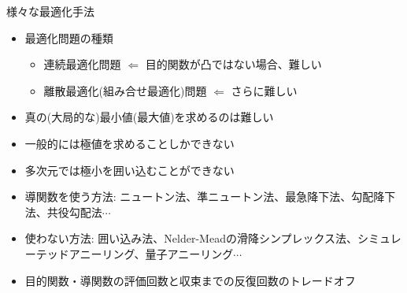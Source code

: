 \begin{frame}[t,fragile]{様々な最適化手法}
  \begin{itemize}
  \item 最適化問題の種類
    \begin{itemize}
    \item 連続最適化問題 $\Leftarrow$ 目的関数が凸ではない場合、難しい
    \item 離散最適化(組み合せ最適化)問題 $\Leftarrow$ さらに難しい
    \end{itemize}
  \item 真の(大局的な)最小値(最大値)を求めるのは難しい
  \item 一般的には極値を求めることしかできない
  \item 多次元では極小を囲い込むことができない
  \item 導関数を使う方法: ニュートン法、準ニュートン法、最急降下法、勾配降下法、共役勾配法$\cdots$
  \item 使わない方法: 囲い込み法、Nelder-Meadの滑降シンプレックス法、シミュレーテッドアニーリング、量子アニーリング$\cdots$
  \item 目的関数・導関数の評価回数と収束までの反復回数のトレードオフ
  \end{itemize}
\end{frame}
